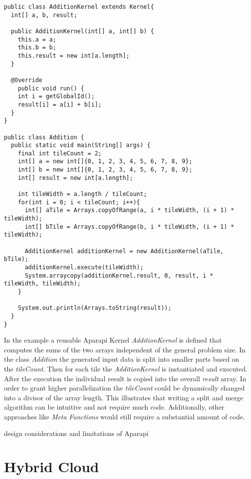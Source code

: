 \begin{lstlisting}
public class AdditionKernel extends Kernel{
  int[] a, b, result;

  public AdditionKernel(int[] a, int[] b) {
    this.a = a;
    this.b = b;
    this.result = new int[a.length];
  }

  @Override
    public void run() {
    int i = getGlobalId();
    result[i] = a[i] + b[i];
  }
}

public class Addition {
  public static void main(String[] args) {
    final int tileCount = 2;
    int[] a = new int[]{0, 1, 2, 3, 4, 5, 6, 7, 8, 9};
    int[] b = new int[]{0, 1, 2, 3, 4, 5, 6, 7, 8, 9};
    int[] result = new int[a.length];

    int tileWidth = a.length / tileCount;
    for(int i = 0; i < tileCount; i++){
      int[] aTile = Arrays.copyOfRange(a, i * tileWidth, (i + 1) * tileWidth);
      int[] bTile = Arrays.copyOfRange(b, i * tileWidth, (i + 1) * tileWidth);

      AdditionKernel additionKernel = new AdditionKernel(aTile, bTile);
      additionKernel.execute(tileWidth);
      System.arraycopy(additionKernel.result, 0, result, i * tileWidth, tileWidth);
    }

    System.out.println(Arrays.toString(result));
  }
}

\end{lstlisting}

In the example a reusable Aparapi Kernel \textit{AdditionKernel} is defined that computes the sums of the two arrays independent of the general problem size. In the class \textit{Addition} the generated input data is split into smaller parts based on the \textit{tileCount}. Then for each tile the \textit{AdditionKernel} is instantiated and executed. After the execution the individual result is copied into the overall \textit{result} array. In order to grant higher parallelization the \textit{tileCount} could be dynamically changed into a divisor of the array length. This illustrates that writing a split and merge algorithm can be intuitive and not require much code. Additionally, other approaches like \textit{Meta Functions} would still require a substantial amount of code.


design considerations and limitations of Aparapi

\section{Hybrid Cloud}

